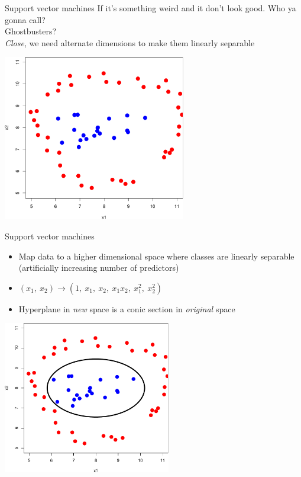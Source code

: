 \documentclass[pdf]{beamer}
\begin{document}
\begin{frame}{Support vector machines}
If it's something weird and it don't look good. Who ya gonna call?\\
Ghostbusters?\\ 
\textit{Close}, we need alternate dimensions to make them linearly separable
\vfill
\begin{center}
		\includegraphics[width=0.6\textwidth]{svmNonLinear1.pdf}
\end{center}
\end{frame}
\begin{frame}{Support vector machines}
\begin{itemize}
	\item Map data to a higher dimensional space where classes are linearly separable
	(artificially increasing number of predictors)
	\item $(x_1,\ x_2) \rightarrow (1,\ x_1,\ x_2,\ x_1x_2,\ x_1^2,\ x_2^2)$
	\item Hyperplane in \textit{new} space is a conic section in \textit{original} space 
\end{itemize}
\begin{center}
		\includegraphics[width=0.55\textwidth]{svmNonLinear2.pdf}
\end{center}
\end{frame}
\end{document}

